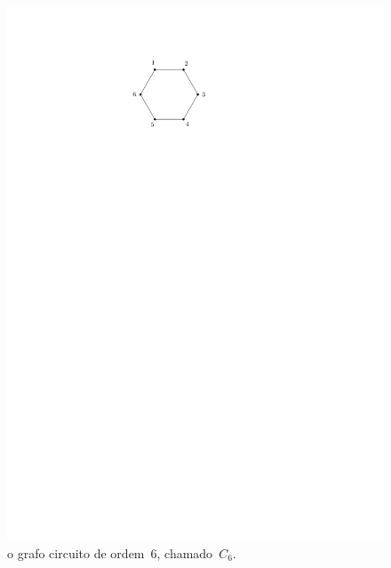 \documentclass[12pt, a4paper]{article}
\theoremstyle{definition}
\begin{document}
\begin{figure}[H]
    \centering
    \includegraphics{circuito.pdf}
    \caption{o grafo circuito de ordem~$6$, chamado~$C_6$.}
    \label{fig:circuito}
\end{figure}
\end{document}
